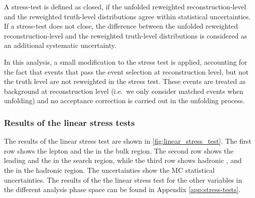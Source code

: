 \begin{itemize}
\end{itemize}

A stress-test is defined as closed, if the unfolded reweighted reconstruction-level and the reweighted truth-level distributions agree within statistical uncertainties. If a stress-test does not close, the difference between the unfolded reweighted reconstruction-level and the reweighted truth-level distributions is considered as an additional systematic uncertainty.

In this analysis, a small modification to the stress test is applied, accounting for the fact that events that pass the event selection at reconstruction level, but not the truth level are not reweighted in the stress test. These events are treated as background at reconstruction level (i.e.\ we only consider matched events when unfolding) and no acceptance correction is carried out in the unfolding process.

\subsubsection{Results of the linear stress tests}

The results of the linear stress test are shown in \cref{fig:linear_stress_test}. The first row shows the lepton \pt and the \met in the bulk region. The second row shows the leading \bjet \pt and the \mtblmin in the search region, while the third row shows hadronic \Wboson, \pt and \mbWminimax the in the hadronic \Wboson region. The uncertainties show the MC statistical uncertainties. 
The results of the the linear stress test for the other variables in the different analysis phase space can be found in Appendix \cref{app:stress-tests}.

